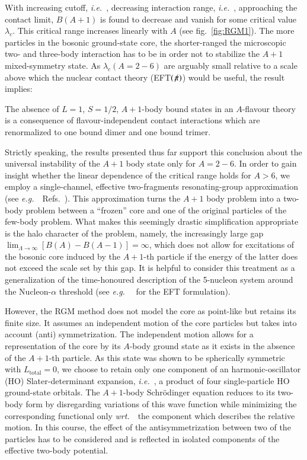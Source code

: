 \documentclass[preprint,12pt]{elsarticle}
\newcommand{\lc}{\ensuremath{\lambda_c}}
\newcommand{\wrt}{\textit{wrt.}~}
\newcommand{\eg}{\textit{e.g.}~}
\newcommand{\ie}{\textit{i.e.}~}
\newcommand{\eftnopi}{\mbox{EFT$(\not \! \pi)$}}
\newcommand{\figref}[1]{fig.~\ref{#1}}
\begin{document}
With increasing cutoff, \ie, decreasing interaction range, \ie, approaching the 
contact limit, $B(A+1)$ is found to decrease
and vanish for some critical value $\lc$. This critical
range increases linearly with $A$ (see \figref{fig:RGM1}).
The more particles in the bosonic ground-state core, the shorter-ranged the 
microscopic two- and three-body interaction
has to be in order not to stabilize the $A+1$ mixed-symmetry state.
As $\lc(A=2-6)$ are arguably small relative to a scale above
which the nuclear contact theory (\eftnopi) would
be useful, the result implies:

The absence of $L=1$, $S=1/2$, $A+1$-body bound states in an $A$-flavour theory
is a consequence of flavour-independent contact interactions which are
renormalized to one bound dimer and one bound trimer. 

Strictly speaking, the results presented thus far support this conclusion about the
universal instability of the $A+1$
body state only for $A=2-6$. In order to gain insight whether the linear
dependence of the critical range holds for
$A>6$, we employ a single-channel, effective two-fragments resonating-group
approximation (see \eg~Refs.~\cite{PhysRev.52.1083,Naidon_2016}). This approximation
turns the $A+1$ body problem into a two-body problem between a ``frozen'' 
core and one of the original particles of
the few-body problem. What makes this seemingly drastic simplification 
appropriate is the halo character of the problem,
namely, the increasingly large gap
$\lim_{\Lambda\to\infty}\left[B(A)-B(A-1)\right]=\infty$, which does not
allow for excitations of the bosonic core induced by the $A+1$-th particle if the
energy of the latter
does not exceed the scale set by this gap. It is helpful to consider this
treatment as a generalization of the
time-honoured description of the 5-nucleon system around the Nucleon-$\alpha$
threshold (see \eg~\cite{Bertulani:2002sz,Brown:2013zla} for the EFT formulation).

However, the RGM method does not model the core as point-like but retains
its finite size. It assumes
an independent motion of the core particles but takes into account (anti)
symmetrization.
The independent motion allows for a representation of the core by
its $A$-body ground state as it exists in the absence of the $A+1$-th particle.
As this state was shown
to be spherically symmetric with $L_\text{total}=0$, we choose to retain only one
component of an harmonic-oscillator (HO)
Slater-determinant expansion, \ie, a product of four single-particle HO
ground-state orbitals.
The $A+1$-body Schr\"odinger equation reduces to its two-body form by disregarding
variations of this wave function
while minimizing the corresponding functional only \wrt~the component
which describes the relative motion.
In this course, the effect of the antisymmetrization between two of
the particles has to be considered and is reflected
in isolated components of the effective two-body potential.
\end{document}
